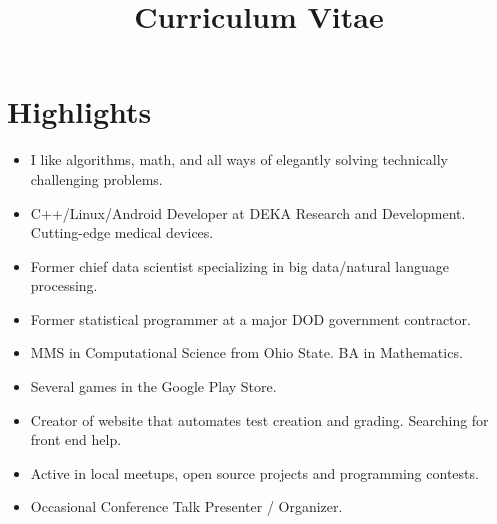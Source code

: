 \documentclass[11pt,a4paper,sans]{moderncv} %
\title{Curriculum Vitae}
\begin{document}
\makecvtitle %

\section{Highlights}
\begin{itemize}
\item I like algorithms, math, and all ways of elegantly solving technically challenging problems.
\item C++/Linux/Android Developer at DEKA Research and Development. Cutting-edge medical devices.
\item Former chief data scientist specializing in big data/natural language processing.
\item Former statistical programmer at a major DOD government contractor.
\item MMS in Computational Science from Ohio State. BA in Mathematics.
\item Several games in the Google Play Store.
\item Creator of website that automates test creation and grading. Searching for front end help.
\item Active in local meetups, open source projects and programming contests.
\item Occasional Conference Talk Presenter / Organizer.
\end{itemize}
\end{document}

